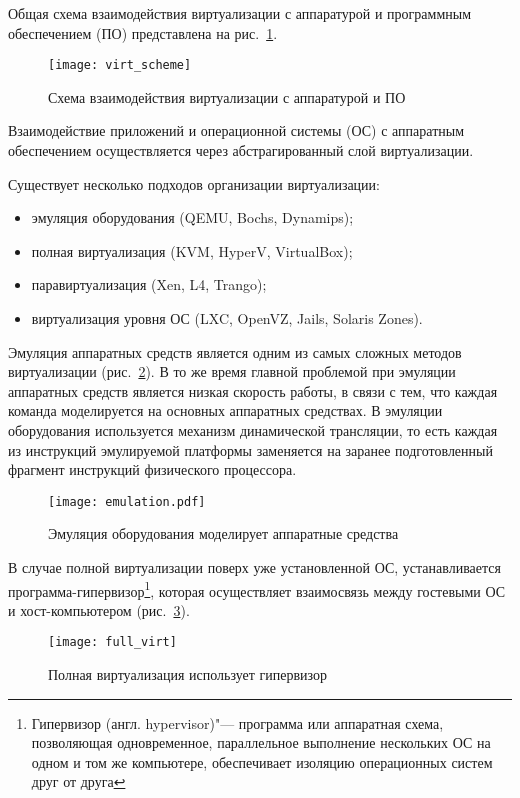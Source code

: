 Общая схема взаимодействия виртуализации с аппаратурой и программным обеспечением (ПО) представлена на рис.~\ref{pic:virt_scheme}.
\begin{figure}[ht]
    \centering
	\texttt{[image: virt\_scheme]}
	\caption{Схема взаимодействия виртуализации с аппаратурой и ПО}\label{pic:virt_scheme}
\end{figure}

Взаимодействие приложений и операционной системы (ОС) с аппаратным обеспечением осуществляется через абстрагированный слой виртуализации.

Существует несколько подходов организации виртуализации:
\begin{itemize}
    \item эмуляция оборудования (QEMU, Bochs, Dynamips);
    \item полная виртуализация (KVM, HyperV, VirtualBox);
    \item паравиртуализация (Xen, L4, Trango);
    \item виртуализация уровня ОС (LXC, OpenVZ, Jails, Solaris Zones).
\end{itemize}

Эмуляция аппаратных средств является одним из самых сложных методов виртуализации (рис.~\ref{pic:emulation}).
В то же время главной проблемой при эмуляции аппаратных средств является низкая скорость работы, в связи с тем, что каждая команда моделируется на основных аппаратных средствах.
В эмуляции оборудования используется механизм динамической трансляции, то есть каждая из инструкций эмулируемой платформы заменяется на заранее подготовленный фрагмент инструкций физического процессора.
\begin{figure}[ht]
    \centering
	\texttt{[image: emulation.pdf]}
	\caption{Эмуляция оборудования моделирует аппаратные средства}\label{pic:emulation}
\end{figure}

В случае полной виртуализации поверх уже установленной ОС, устанавливается программа-гипервизор\footnote{Гипервизор (англ. hypervisor)"--- программа или аппаратная схема, позволяющая одновременное, параллельное выполнение нескольких ОС на одном и том же компьютере, обеспечивает изоляцию операционных систем друг от друга}, которая осуществляет взаимосвязь между гостевыми ОС и хост-компьютером (рис.~\ref{pic:full_virt}).
\begin{figure}[ht]
    \centering
	\texttt{[image: full\_virt]}
	\caption{Полная виртуализация использует гипервизор}\label{pic:full_virt}
\end{figure}

